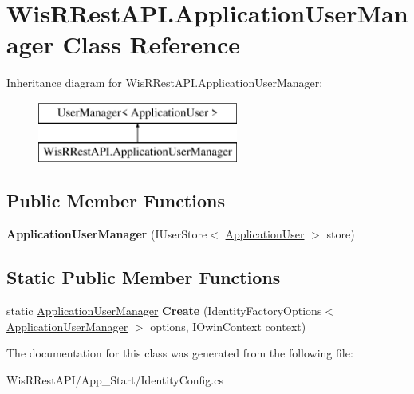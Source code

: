 \hypertarget{class_wis_r_rest_a_p_i_1_1_application_user_manager}{}\section{Wis\+R\+Rest\+A\+P\+I.\+Application\+User\+Manager Class Reference}
\label{class_wis_r_rest_a_p_i_1_1_application_user_manager}
Inheritance diagram for Wis\+R\+Rest\+A\+P\+I.\+Application\+User\+Manager\+:\begin{figure}[H]
\begin{center}
\leavevmode
\includegraphics[height=2.000000cm]{class_wis_r_rest_a_p_i_1_1_application_user_manager}
\end{center}
\end{figure}
\subsection*{Public Member Functions}
\begin{DoxyCompactItemize}
\item 
\hypertarget{class_wis_r_rest_a_p_i_1_1_application_user_manager_a3f49e3da13eaccfeaee8efae0d979055}{}{\bfseries Application\+User\+Manager} (I\+User\+Store$<$ \hyperlink{class_wis_r_rest_a_p_i_1_1_models_1_1_application_user}{Application\+User} $>$ store)\label{class_wis_r_rest_a_p_i_1_1_application_user_manager_a3f49e3da13eaccfeaee8efae0d979055}

\end{DoxyCompactItemize}
\subsection*{Static Public Member Functions}
\begin{DoxyCompactItemize}
\item 
\hypertarget{class_wis_r_rest_a_p_i_1_1_application_user_manager_af325f69393180121d8cbceb97b28c010}{}static \hyperlink{class_wis_r_rest_a_p_i_1_1_application_user_manager}{Application\+User\+Manager} {\bfseries Create} (Identity\+Factory\+Options$<$ \hyperlink{class_wis_r_rest_a_p_i_1_1_application_user_manager}{Application\+User\+Manager} $>$ options, I\+Owin\+Context context)\label{class_wis_r_rest_a_p_i_1_1_application_user_manager_af325f69393180121d8cbceb97b28c010}

\end{DoxyCompactItemize}


The documentation for this class was generated from the following file\+:\begin{DoxyCompactItemize}
\item 
Wis\+R\+Rest\+A\+P\+I/\+App\+\_\+\+Start/Identity\+Config.\+cs\end{DoxyCompactItemize}

